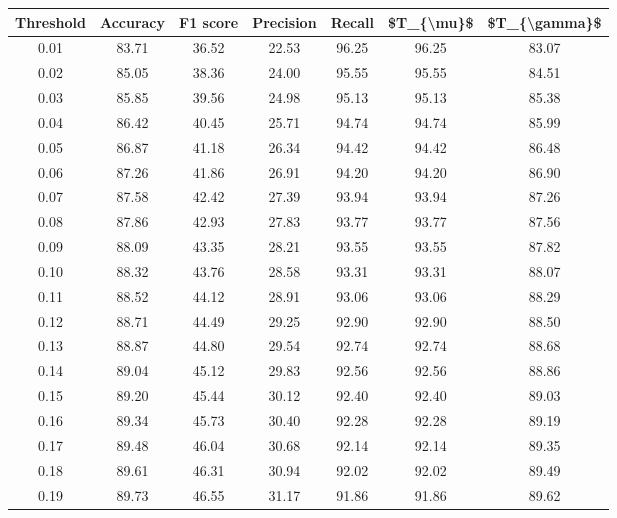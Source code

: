 \begin{tabular}{|c|c|c|c|c|c|c|}
\hline
 Threshold &  Accuracy &  F1 score &  Precision &  Recall &  \$T\_\{\textbackslash mu\}\$ &  \$T\_\{\textbackslash gamma\}\$ \\
\hline
      0.01 &     83.71 &     36.52 &      22.53 &   96.25 &      96.25 &         83.07 \\
      0.02 &     85.05 &     38.36 &      24.00 &   95.55 &      95.55 &         84.51 \\
      0.03 &     85.85 &     39.56 &      24.98 &   95.13 &      95.13 &         85.38 \\
      0.04 &     86.42 &     40.45 &      25.71 &   94.74 &      94.74 &         85.99 \\
      0.05 &     86.87 &     41.18 &      26.34 &   94.42 &      94.42 &         86.48 \\
      0.06 &     87.26 &     41.86 &      26.91 &   94.20 &      94.20 &         86.90 \\
      0.07 &     87.58 &     42.42 &      27.39 &   93.94 &      93.94 &         87.26 \\
      0.08 &     87.86 &     42.93 &      27.83 &   93.77 &      93.77 &         87.56 \\
      0.09 &     88.09 &     43.35 &      28.21 &   93.55 &      93.55 &         87.82 \\
      0.10 &     88.32 &     43.76 &      28.58 &   93.31 &      93.31 &         88.07 \\
      0.11 &     88.52 &     44.12 &      28.91 &   93.06 &      93.06 &         88.29 \\
      0.12 &     88.71 &     44.49 &      29.25 &   92.90 &      92.90 &         88.50 \\
      0.13 &     88.87 &     44.80 &      29.54 &   92.74 &      92.74 &         88.68 \\
      0.14 &     89.04 &     45.12 &      29.83 &   92.56 &      92.56 &         88.86 \\
      0.15 &     89.20 &     45.44 &      30.12 &   92.40 &      92.40 &         89.03 \\
      0.16 &     89.34 &     45.73 &      30.40 &   92.28 &      92.28 &         89.19 \\
      0.17 &     89.48 &     46.04 &      30.68 &   92.14 &      92.14 &         89.35 \\
      0.18 &     89.61 &     46.31 &      30.94 &   92.02 &      92.02 &         89.49 \\
      0.19 &     89.73 &     46.55 &      31.17 &   91.86 &      91.86 &         89.62 \\

\end{tabular}
